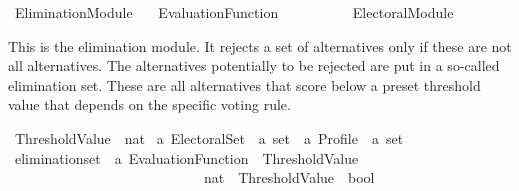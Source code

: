 %
\begin{isabellebody}%
%
%
\isadelimdocument
\isanewline
%
\endisadelimdocument
%
\isatagdocument
\isanewline
%
\isamarkuptrue%
%
\endisatagdocument
{\isafolddocument}%
%
\isadelimdocument
%
\endisadelimdocument
%
\isadelimtheory
%
\endisadelimtheory
%
\isatagtheory
{}\isamarkupfalse%
\ Elimination{\isacharunderscore}{\kern0pt}Module\isanewline
\ \ \ {\isachardoublequoteopen}{\isachardot}{\kern0pt}{\isachardot}{\kern0pt}{\isacharslash}{\kern0pt}Evaluation{\isacharunderscore}{\kern0pt}Function{\isachardoublequoteclose}\isanewline
\ \ \ \ \ \ \ \ \ \ {\isachardoublequoteopen}{\isachardot}{\kern0pt}{\isachardot}{\kern0pt}{\isacharslash}{\kern0pt}Electoral{\isacharunderscore}{\kern0pt}Module{\isachardoublequoteclose}\isanewline
\isanewline
{}%
\endisatagtheory
{\isafoldtheory}%
%
\isadelimtheory
%
\endisadelimtheory
%
\begin{isamarkuptext}%
This is the elimination module. It rejects a set of alternatives only if these
are not all alternatives. The alternatives potentially to be rejected are put
in a so-called elimination set. These are all alternatives that score below
a preset threshold value that depends on the specific voting rule.%
\end{isamarkuptext}\isamarkuptrue%
%
\isadelimdocument
%
\endisadelimdocument
%
\isatagdocument
%
\isamarkuptrue%
%
\endisatagdocument
{\isafolddocument}%
%
\isadelimdocument
%
\endisadelimdocument
{}\isamarkupfalse%
\ Threshold{\isacharunderscore}{\kern0pt}Value\ {\isacharequal}{\kern0pt}\ nat\isanewline
\isanewline
{}\isamarkupfalse%
\ {\isacharprime}{\kern0pt}a\ Electoral{\isacharunderscore}{\kern0pt}Set\ {\isacharequal}{\kern0pt}\ {\isachardoublequoteopen}{\isacharprime}{\kern0pt}a\ set\ {\isasymRightarrow}\ {\isacharprime}{\kern0pt}a\ Profile\ {\isasymRightarrow}\ {\isacharprime}{\kern0pt}a\ set{\isachardoublequoteclose}\isanewline
\isanewline
{}\isamarkupfalse%
\ elimination{\isacharunderscore}{\kern0pt}set\ {\isacharcolon}{\kern0pt}{\isacharcolon}{\kern0pt}\ {\isachardoublequoteopen}{\isacharprime}{\kern0pt}a\ Evaluation{\isacharunderscore}{\kern0pt}Function\ {\isasymRightarrow}\ Threshold{\isacharunderscore}{\kern0pt}Value\ {\isasymRightarrow}\isanewline
\ \ \ \ \ \ \ \ \ \ \ \ \ \ \ \ \ \ \ \ \ \ \ \ \ \ \ \ {\isacharparenleft}{\kern0pt}nat\ {\isasymRightarrow}\ Threshold{\isacharunderscore}{\kern0pt}Value\ {\isasymRightarrow}\ bool{\isacharparenright}{\kern0pt}\ {\isasymRightarrow}\isanewline

\end{isabellebody}
